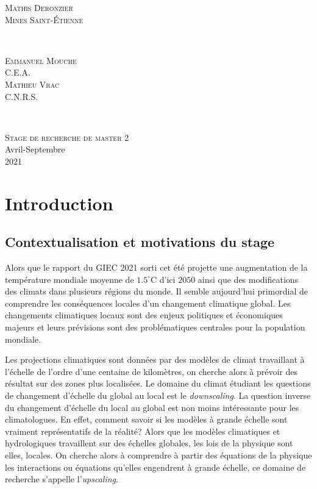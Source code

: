 \documentclass[a4paper,11pt]{article}
\numberwithin{equation}{section}
\begin{document}
	\begin{minipage}{0.4\textwidth}
		\begin{flushleft} \large
			\textsc{Mathis Deronzier}\\
			\textsc{Mines Saint-Étienne}
		\end{flushleft}
	\end{minipage}
	~
	\begin{minipage}{0.4\textwidth}
		\begin{flushright} \large
			\textsc{Emmanuel Mouche}\\
			\textsc{C.E.A.}\\
			\textsc{Mathieu Vrac}\\
			\textsc{C.N.R.S.}
		\end{flushright}
	\end{minipage}\\[2cm]
	\begin{center}
		\textsc{\Large Stage de recherche de master 2}\\[0.5cm]  
		\large Avril-Septembre\\2021\\[2cm]
	\end{center}

\newpage
\tableofcontents

\newpage
\section{Introduction}
\label{ch:introduction}

\subsection{Contextualisation et motivations du stage}
\label{ch:Contextualisation et motivations du stage}

Alors que le rapport du GIEC 2021 sorti cet été projette une augmentation de la température mondiale moyenne de $1.5^{\circ}$C d'ici $2050$ ainsi que des modifications des climats dans plusieurs régions du monde. Il semble aujourd'hui primordial de comprendre les conséquences locales d'un changement climatique global. Les changements climatiques locaux sont des enjeux politiques et économiques majeurs et leurs prévisions sont des problématiques centrales pour la population mondiale.

Les projections climatiques sont données par des modèles de climat travaillant à l'échelle de l'ordre d'une centaine de kilomètres, on cherche alors à prévoir des résultat sur des zones plus localisées. Le domaine du climat étudiant les questions de changement d'échelle du global au local est le \textit{downscaling}. La question inverse du changement d'échelle du local au global est non moins intéressante pour les climatologues. En effet, comment savoir si les modèles à grande échelle sont vraiment représentatifs de la réalité? Alors que les modèles climatiques et hydrologiques travaillent sur des échelles globales, les lois de la physique sont elles, locales. On cherche alors à comprendre à partir des équations de la physique les interactions ou équations qu'elles engendrent à grande échelle, ce domaine de recherche s'appelle l'\textit{upscaling}. 
\end{document}
